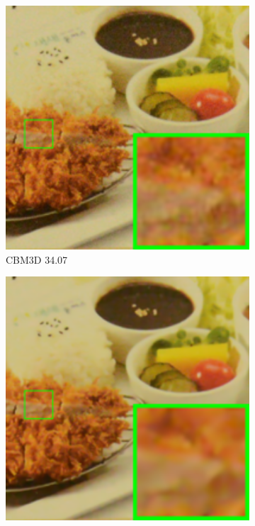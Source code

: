 \begin{figure}
\begin{subfigure}[t]{0.19\textwidth}
        \includegraphics[width=1\textwidth]{images/mcwnnm/cc/resize_br_CBM3D_CC15_d800_iso3200_2.png}
		\caption{CBM3D 34.07}
    \end{subfigure}
    \hfill
    \begin{subfigure}[t]{0.19\textwidth}
        \centering
        \includegraphics[width=1\textwidth]{images/mcwnnm/cc/resize_br_TRD_CC15_d800_iso3200_2.png}

\end{subfigure}
\end{figure}
